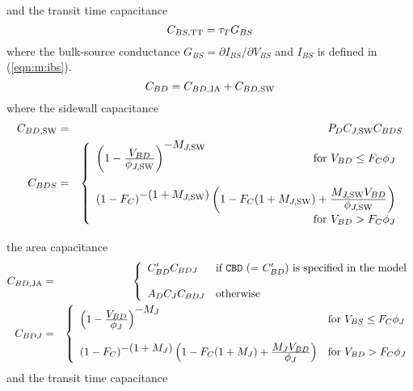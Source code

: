 and the transit time capacitance
\begin{equation}
C_{BS,\mbox{\scriptsize TT}} = \tau_T G_{BS}
\end{equation}
where the bulk-source conductance $G_{BS} = \partial I_{BS} / \partial V_{BS}$
 and
$I_{BS}$ is defined in (\ref{eqn:m:ibs}).
\begin{equation}
C_{BD} = C_{BD,\mbox{\scriptsize JA}} + C_{BD,\mbox{\scriptsize SW}}
\end{equation}
where the sidewall capacitance
\begin{eqnarray}
C_{BD,\ms{SW}} &=& \PD\CJSW C_{BDS} \\
C_{BDS} &=& \left\{ \begin{array}{l}
       \left( 1 - {{\textstyle V_{BD}}
       \over {\textstyle\PBSW}} \right)^{\textstyle -\MJSW}
       \hfill \mbox{for $V_{BD}  \le \FC\PB$} \\ \\
       (1 - \FC )^{\textstyle -(1+\MJSW )}
       \left(1 - \FC (1+\MJSW )
       + {{\textstyle \MJSW V_{BD}} 
       \over { \textstyle \PBSW}} \right)
       \\ \hspace*{\fill} \mbox{for $V_{BD}  > \FC\PB$}
       \end{array} \right. \\ %
\end{eqnarray}

the area capacitance
\begin{eqnarray}
C_{BD,\ms{JA}} &=&
  \left\{ \begin{array}{ll}
  \CBD C_{BDJ} &  \mbox{if {\tt CBD} (= $\CBD$)
                    is specified in the model} \\ \\
  A_D\CJ C_{BDJ} & \mbox{otherwise} \end{array} \right. \\ %
C_{BDJ} &=& \left\{ \begin{array}{ll}
       \left(1 - {\textstyle {V_{BD}} \over
       {\textstyle \PB}} \right)^{\textstyle -\MJ}
       & \mbox{for $V_{BS}  \le \FC\PB$} \\ \\
       (1 -\FC)^{\textstyle -(1+\MJ)}
       \left(1 - \FC (1+\MJ)
       + {{\textstyle\MJ V_{BD}} \over {\textstyle \PB}} \right)
       & \mbox{for $V_{BD}  > \FC\PB$}
       \end{array} \right. %
\end{eqnarray}
and the transit time capacitance

